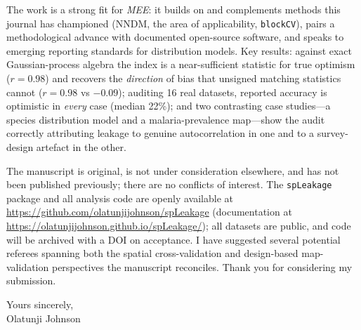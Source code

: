 \documentclass[11pt,a4paper]{article}
\begin{document}
The work is a strong fit for \emph{MEE}: it builds on and complements methods this
journal has championed (NNDM, the area of applicability, \texttt{blockCV}), pairs a
methodological advance with documented open-source software, and speaks to emerging
reporting standards for distribution models. Key results: against exact
Gaussian-process algebra the index is a near-sufficient statistic for true optimism
($r=0.98$) and recovers the \emph{direction} of bias that unsigned matching statistics
cannot ($r=0.98$ vs $-0.09$); auditing 16 real datasets, reported accuracy is
optimistic in \emph{every} case (median 22\%); and two contrasting case studies---a
species distribution model and a malaria-prevalence map---show the audit correctly
attributing leakage to genuine autocorrelation in one and to a survey-design artefact
in the other.

The manuscript is original, is not under consideration elsewhere, and has not been
published previously; there are no conflicts of interest. The \texttt{spLeakage}
package and all analysis code are openly available at
\url{https://github.com/olatunjijohnson/spLeakage} (documentation at
\url{https://olatunjijohnson.github.io/spLeakage/}); all datasets are public, and code
will be archived with a DOI on acceptance. I have suggested several potential referees
spanning both the spatial cross-validation and design-based map-validation
perspectives the manuscript reconciles. Thank you for considering my submission.

\noindent Yours sincerely,\\[0.4em]
Olatunji Johnson
\end{document}
